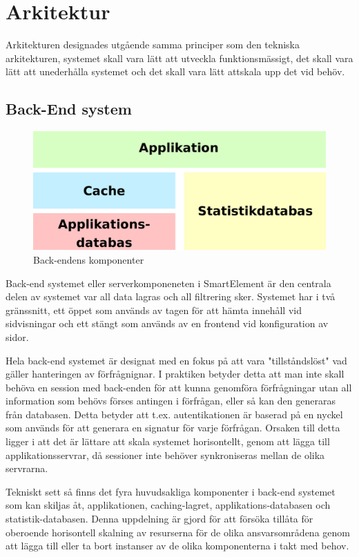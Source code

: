 \section{Arkitektur}

Arkitekturen designades utgående samma principer som den tekniska arkitekturen, systemet skall vara lätt att utveckla funktionsmässigt, det skall vara lätt att unederhålla systemet och det skall vara lätt attskala upp det vid behöv. 

\subsection{Back-End system}

\begin{figure}[h!]
\centering
\includegraphics[width=120mm]{assets/images/smelementbackendparts.png}
\caption{Back-endens komponenter}
\label{abstractbackend}
\end{figure}

Back-end systemet eller serverkomponeneten i SmartElement är den centrala delen av systemet var all data lagras och all filtrering sker. Systemet har i två gränssnitt, ett öppet som används av tagen för att hämta innehåll vid sidvisningar och ett stängt som används av en frontend vid konfiguration av sidor.

Hela back-end systemet är designat med en fokus på att vara "tillståndslöst" vad gäller hanteringen av förfrågnignar. I praktiken betyder detta att man inte skall behöva en session med back-enden för att kunna genomföra förfrågningar utan all information som behövs förses antingen i förfrågan, eller så kan den generaras från databasen. Detta betyder att t.ex. autentikationen är baserad på en nyckel som används för att generara en signatur för varje förfrågan. Orsaken till detta ligger i att det är lättare att skala systemet horisontellt, genom att lägga till applikationsservrar, då sessioner inte behöver synkroniseras mellan de olika servrarna.

Tekniskt sett så finns det fyra huvudsakliga komponenter i back-end systemet som kan skiljas åt, applikationen, caching-lagret, applikations-databasen och statistik-databasen. Denna uppdelning är gjord för att försöka tillåta för oberoende horisontell skalning av resurserna för de olika ansvarsområdena genom att lägga till eller ta bort instanser av de olika komponenterna i takt med behov.


